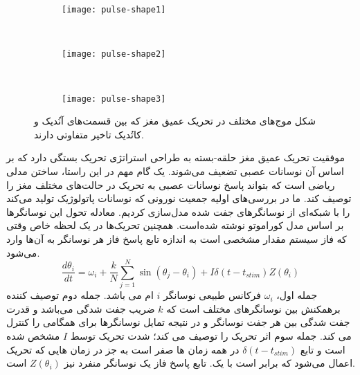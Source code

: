 \begin{figure}[b!]
     \centering
     \begin{subfigure}[t]{0.3\textwidth}
         \centering
         \texttt{[image: pulse-shape1]}
     \end{subfigure}
     \
     \begin{subfigure}[t]{0.3\textwidth}
         \centering
         \texttt{[image: pulse-shape2]}
     \end{subfigure}
     \
     \begin{subfigure}[t]{0.3\textwidth}
         \centering
         \texttt{[image: pulse-shape3]}
     \end{subfigure}
        \caption{
شکل موج‌های مختلف در تحریک عمیق مغز که بین قسمت‌های آنُدیک و کاتُدیک تاخیر متفاوتی دارند.
         }
        \label{fig:dbs-pulse-shape}
\end{figure}



موفقیت تحریک عمیق مغز حلقه-بسته به طراحی استراتژی تحریک بستگی دارد که بر اساس آن نوسانات عصبی تضعیف می‌شوند. یک گام مهم در این راستا، ساختن مدلی ریاضی است که بتواند پاسخ نوسانات عصبی به تحریک در حالت‌های مختلف مغز را توصیف کند.
ما در بررسی‌های اولیه جمعیت نورونی که نوسانات پاتولوژیک تولید می‌کند را با شبکه‌ای از نوسانگرهای جفت شده مدل‌سازی کردیم. معادله تحول این نوسانگرها بر اساس مدل کوراموتو نوشته شده‌است. همچنین تحریک‌ها در یک لحظه خاص وقتی که فاز سیستم مقدار مشخصی است به اندازه تابع پاسخ فاز هر نوسانگر به آن‌ها وارد می‌شود.
\begin{equation}
    \frac{d \theta_i}{dt} = \omega_i + \frac{k}{N} \sum_{j=1}^{N} \sin(\theta_j -\theta_i) + I \delta(t-t_{stim}) Z(\theta_i)
    \label{eq:kuramotoModelres}
\end{equation}
جمله اول، 
$\omega_i$
فرکانس طبیعی نوسانگر 
$i$ 
ام می باشد.
جمله دوم توصیف کننده برهمکنش بین نوسانگرهای مختلف است که 
$k$
ضریب جفت شدگی می‌باشد و قدرت جفت شدگی بین هر جفت نوسانگر و در نتیجه تمایل نوسانگرها برای همگامی را کنترل می کند. 
جمله سوم اثر تحریک را توصیف می کند؛ شدت تحریک توسط 
$I$
مشخص شده است و تابع 
$\delta(t-t_{stim})$
در همه زمان ها صفر است به جز در زمان هایی که تحریک اعمال می‌شود که برابر است با یک.
تابع پاسخ فاز یک نوسانگر منفرد نیز
$Z(\theta_i)$
است.

